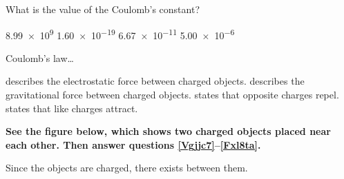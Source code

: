 \documentclass[]{exam}
\begin{document}
\begin{questions}
\question
What is the value of the Coulomb's constant?

\begin{randomizechoices}
    \correctchoice \num{8.99e9}
    \choice \num{1.60e-19}
    \choice \num{6.67e-11}
    \choice \num{5.00e-6}
\end{randomizechoices}

\question
Coulomb's law\ldots

\begin{randomizechoices}
    \correctchoice describes the electrostatic force between charged objects.
    \choice describes the gravitational force between charged objects.
    \choice states that opposite charges repel.
    \choice states that like charges attract.
\end{randomizechoices}
\vspace{1em}


\clearpage
\begin{EnvUplevel}
\textbf{See the figure below, which shows two charged objects placed near each other. Then answer questions \ref{Vgjjc7}--\ref{Fxl8ta}.}
\end{EnvUplevel}

\vspace{-1em}



\begin{center}
\end{center}

\question \label{Vgjjc7}
Since the objects are charged, there exists \fillin[][5cm] between them.


\end{questions}
\end{document}
